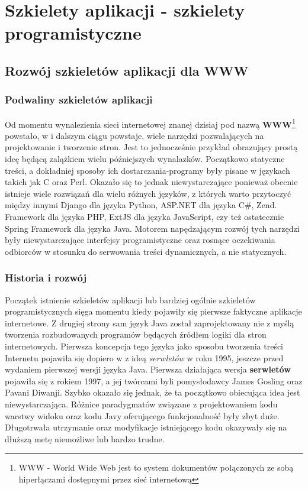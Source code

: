 \chapter{Szkielety aplikacji - szkielety programistyczne}

\section{Rozwój szkieletów aplikacji dla WWW}
	\subsection{Podwaliny szkieletów aplikacji}
		Od momentu wynalezienia sieci internetowej znanej dzisiaj pod nazwą \textbf{WWW}\footnote{WWW - World Wide Web jest to system dokumentów połączonych ze sobą hiperłączami 
		dostępnymi przez sieć internetową} powstało, w i dalszym ciągu powstaje, wiele narzędzi pozwalających na projektowanie i tworzenie stron. Jest to jednocześnie przykład obrazujący
		prostą ideę będącą zalążkiem wielu późniejszych wynalazków. Początkowo statyczne treści, a dokładniej sposoby ich dostarczania-programy były pisane w językach takich jak C oraz Perl.
		Okazało się to jednak niewystarczające ponieważ obecnie istnieje wiele rozwiązań dla wielu różnych języków, z których warto przytoczyć między innymi Django dla języka Python, ASP.NET\cite{asp_net} dla języka C#, Zend.
		Framework dla języka PHP, ExtJS dla języka JavaScript, czy też ostatecznie Spring Framework dla języka Java. Motorem napędzającym rozwój tych narzędzi 
		były niewystarczające interfejsy programistyczne oraz rosnące oczekiwania odbiorców w stosunku do serwowania treści dynamicznych, a nie statycznych\cite{art_of_java_web_dev}.
	\subsection{Historia i rozwój}
		Początek istnienie szkieletów aplikacji lub bardziej ogólnie szkieletów programistycznych sięga momentu kiedy pojawiły się pierwsze faktyczne aplikacje internetowe.
		Z drugiej strony sam język Java został zaprojektowany nie z myślą tworzenia rozbudowanych programów będących źródłem logiki dla stron internetowych. 
		Pierwsza koncepcja tego języka jako sposobu tworzenia treści Internetu pojawiła się dopiero w z ideą \textit{serwletów} w roku 1995, 
		jeszcze przed wydaniem pierwszej wersji języka Java. Pierwsza działająca wersja \textbf{serwletów} pojawiła się z rokiem 1997, a jej twórcami
		byli pomysłodawcy James Gosling oraz Pavani Diwanji. Szybko okazało się jednak, że ta początkowo obiecująca idea jest niewystarczająca.
		Różnice paradygmatów związane z projektowaniem kodu warstwy widoku oraz kodu Javy oferującego funkcjonalność były zbyt duże. 
		Długotrwała utrzymanie oraz modyfikacje istniejącego kodu okazywały się na dłuższą metę niemożliwe lub bardzo trudne\cite{art_of_java_web_dev}. 
		
